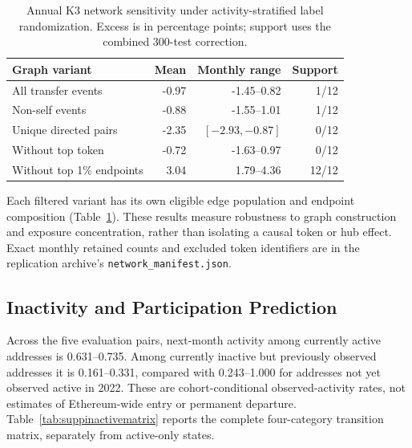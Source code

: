 \documentclass[journal,letterpaper]{IEEEtran}
\begin{document}
\begin{table}[t]
\centering\footnotesize
\caption{Annual K3 network sensitivity under activity-stratified label randomization. Excess is in percentage points; support uses the combined 300-test correction.}
\label{tab:graphsensitivity}
\begin{tabular}{lrrr}
\toprule
Graph variant & Mean & Monthly range & Support \\
\midrule
All transfer events & -0.97 & -1.45--0.82 & 1/12 \\
Non-self events & -0.88 & -1.55--1.01 & 1/12 \\
Unique directed pairs & -2.35 & $[-2.93, -0.87]$ & 0/12 \\
Without top token & -0.72 & -1.63--0.97 & 0/12 \\
Without top 1\% endpoints & 3.04 & 1.79--4.36 & 12/12 \\
\bottomrule
\end{tabular}
\end{table}
Each filtered variant has its own eligible edge population and endpoint composition (Table~\ref{tab:graphsensitivity}). These results measure robustness to graph construction and exposure concentration, rather than isolating a causal token or hub effect. Exact monthly retained counts and excluded token identifiers are in the replication archive's \texttt{network\_manifest.json}.

\subsection{Inactivity and Participation Prediction}
Across the five evaluation pairs, next-month activity among currently active addresses is 0.631--0.735. Among currently inactive but previously observed addresses it is 0.161--0.331, compared with 0.243--1.000 for addresses not yet observed active in 2022. These are cohort-conditional observed-activity rates, not estimates of Ethereum-wide entry or permanent departure. Table~\ref{tab:suppinactivematrix} reports the complete four-category transition matrix, separately from active-only states.
\end{document}
